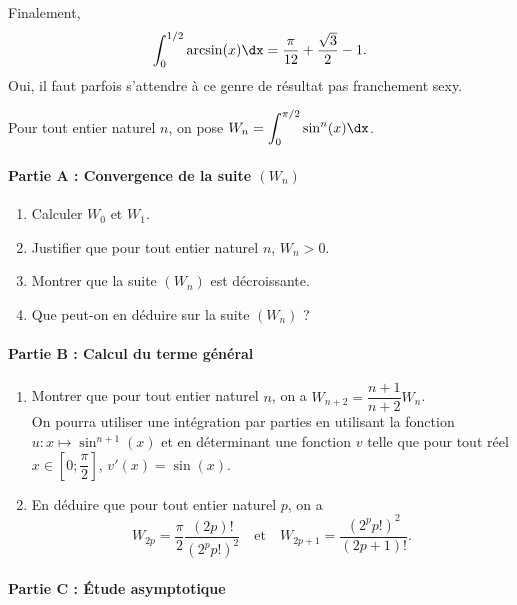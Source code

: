 \documentclass[11pt,fleqn, openany]{book} %
\begin{document}
\begin{solution}
\begin{enumerate}
Finalement,
\[\displaystyle\int_0^{1/2} \arcsin(x) \dx = \dfrac{\pi}{12}+\dfrac{\sqrt{3}}{2}-1.\]
Oui, il faut parfois s'attendre à ce genre de résultat pas franchement sexy.

\end{enumerate}
\newpage
\end{solution}




\begin{exercise}[subtitle={(Intégrales de Wallis)}]

Pour tout entier naturel $n$, on pose $W_n = \displaystyle\int_0^{\pi/2} \sin^n(x) \dx$.

\paragraph{Partie A : Convergence de la suite $(W_n)$}

\begin{enumerate}
\item Calculer $W_0$ et $W_1$.
\item Justifier que pour tout entier naturel $n$, $W_n >0$.
\item Montrer que la suite $(W_n)$ est décroissante. 
\item Que peut-on en déduire sur la suite $(W_n)$ ?
\end{enumerate}

\paragraph{Partie B : Calcul du terme général}

\begin{enumerate}
\item Montrer que pour tout entier naturel $n$, on a $W_{n+2}=\dfrac{n+1}{n+2}W_n$. \\
On pourra utiliser une intégration par parties en utilisant la fonction $u :x \mapsto \sin^{n+1}(x)$ et en déterminant une fonction $v$ telle que pour tout réel $x\in\left[0;\dfrac{\pi}{2}\right]$, $v'(x)=\sin(x)$.
\item En déduire que pour tout entier naturel $p$, on a
\[W_{2p}=\dfrac{\pi}{2}\dfrac{(2p)!}{(2^pp!)^2}\quad \text{et}\quad W_{2p+1}=\dfrac{(2^pp!)^2}{(2p+1)!}.\]
\end{enumerate}

\paragraph{Partie C : Étude asymptotique}


\end{exercise}
\end{document}
